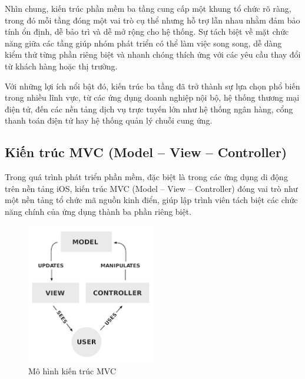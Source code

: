   \begin{flushleft}
  \hspace*{0.8cm}Nhìn chung, kiến trúc phần mềm ba tầng cung cấp một khung tổ chức rõ ràng, trong đó mỗi tầng đóng một vai trò cụ thể nhưng hỗ trợ lẫn nhau nhằm đảm bảo tính ổn định, dễ bảo trì và dễ mở rộng cho hệ thống. Sự tách biệt về mặt chức năng giữa các tầng giúp nhóm phát triển có thể làm việc song song, dễ dàng kiểm thử từng phần riêng biệt và nhanh chóng thích ứng với các yêu cầu thay đổi từ khách hàng hoặc thị trường.
  \end{flushleft}
  
  \begin{flushleft}
  \hspace*{0.8cm}Với những lợi ích nổi bật đó, kiến trúc ba tầng đã trở thành sự lựa chọn phổ biến trong nhiều lĩnh vực, từ các ứng dụng doanh nghiệp nội bộ, hệ thống thương mại điện tử, đến các nền tảng dịch vụ trực tuyến lớn như hệ thống ngân hàng, cổng thanh toán điện tử hay hệ thống quản lý chuỗi cung ứng.
  \end{flushleft}

\subsection{Kiến trúc MVC (Model – View – Controller)}
\renewcommand{\labelitemi}{--}    
    \begin{flushleft}
        \hspace*{0.8cm}Trong quá trình phát triển phần mềm, đặc biệt là trong các ứng dụng di động trên nền tảng iOS, kiến trúc MVC (Model – View – Controller) đóng vai trò như một nền tảng tổ chức mã nguồn kinh điển, giúp lập trình viên tách biệt các chức năng chính của ứng dụng thành ba phần riêng biệt.
    \end{flushleft}

\begin{figure}[h]
  \centering
  \includegraphics[width=0.5\textwidth]{images/mvc.png}
  \caption{Mô hình kiến trúc MVC}
  \label{fig:fig12}
\end{figure}

